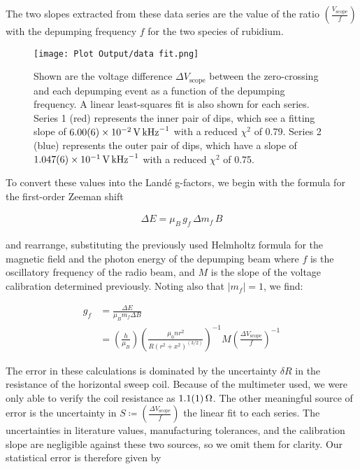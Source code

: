 \documentclass[letter]{article}
\begin{document}
The two slopes extracted from these data series are the value of the ratio $\left( \frac{V_{\text{scope}}}{f}\right)$ with the depumping frequency $f$ for the two species of rubidium.

\begin{figure}[h] \centering
	\texttt{[image: Plot Output/data fit.png]}
	\caption{Shown are the voltage difference $\Delta V_{\text{scope}}$ between the zero-crossing and each depumping event as a function of the depumping frequency. A linear least-squares fit is also shown for each series. Series 1 (red) represents the inner pair of dips, which see a fitting slope of $\qty{6.00 \pm 0.06 e-2}{\volt\per\kilo\hertz}$ with a reduced $\chi^2$ of 0.79. Series 2 (blue) represents the outer pair of dips, which have a slope of $\qty{1.047 \pm 0.006 e-1}{\volt\per\kilo\hertz}$ with a reduced $\chi^2$ of 0.75.}
	\label{fig:dataFit}
\end{figure}


\newpage
To convert these values into the Land{\'e} g-factors, we begin with the formula for the first-order Zeeman shift

\begin{align*}
	\Delta E = \mu_B \, g_f \, \Delta m_f \, B
\end{align*}

\noindent
and rearrange, substituting the previously used Helmholtz formula for the magnetic field and the photon energy of the depumping beam where $f$ is the oscillatory frequency of the radio beam, and $M$ is the slope of the voltage calibration determined previously. Noting also that $|m_f| = 1$, we find:

\begin{align*}
	g_f &= \frac{\Delta E}{\mu_B m_f \Delta B}
	\\&= \left( \frac{h}{\mu_B}\right) \left(  \frac{\mu_0 n r^2}{R (r^2 + x^2)^{(3/2)}}\right)^{-1} M \left( \frac{\Delta V_{\text{scope}}}{f}\right)^{-1}
\end{align*}

The error in these calculations is dominated by the uncertainty $\delta R$ in the resistance of the horizontal sweep coil. Because of the multimeter used, we were only able to verify the coil resistance as $\qty{1.1 \pm .1}{\ohm}$. The other meaningful source of error is the uncertainty in $S \coloneqq \left(\frac{\Delta V_{\text{scope}}}{f}\right)$ the linear fit to each series. The uncertainties in literature values, manufacturing tolerances, and the calibration slope are negligible against these two sources, so we omit them for clarity. Our statistical error is therefore given by
\end{document}

